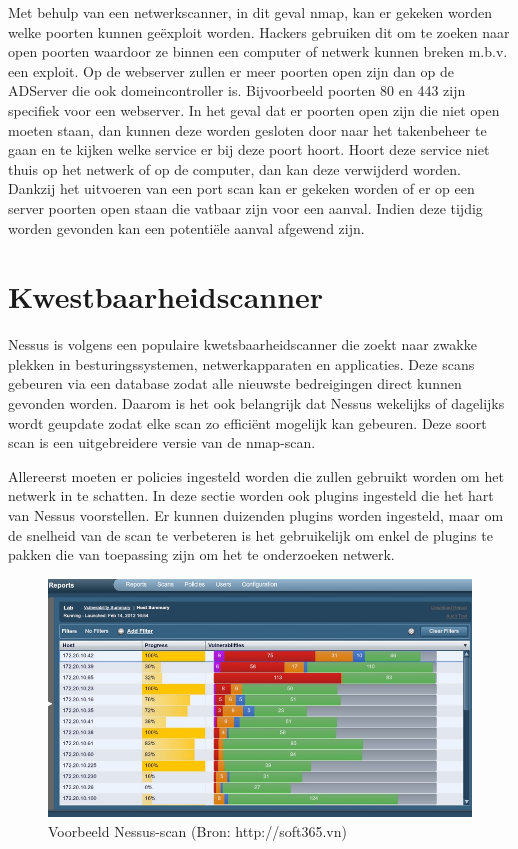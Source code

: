 \documentclass[pdftex,a4paper,12pt]{report}
\begin{document}
Met behulp van een netwerkscanner, in dit geval nmap, kan er gekeken worden welke poorten kunnen geëxploit worden. Hackers gebruiken dit om te zoeken naar open poorten waardoor ze binnen een computer of netwerk kunnen breken m.b.v. een exploit. Op de webserver zullen er meer poorten open zijn dan op de ADServer die ook domeincontroller is. Bijvoorbeeld poorten 80 en 443 zijn specifiek voor een webserver. In het geval dat er poorten open zijn die niet open moeten staan, dan kunnen deze worden gesloten door naar het takenbeheer te gaan en te kijken welke service er bij deze poort hoort. Hoort deze service niet thuis op het netwerk of op de computer, dan kan deze verwijderd worden. Dankzij het uitvoeren van een port scan kan er gekeken worden of er op een server poorten open staan die vatbaar zijn voor een aanval. Indien deze tijdig worden gevonden kan een potentiële aanval afgewend zijn.

\section{Kwestbaarheidscanner}
Nessus is volgens \cite{Jackson2010} een populaire kwetsbaarheidscanner die zoekt naar zwakke plekken in besturingssystemen, netwerkapparaten en applicaties. Deze scans gebeuren via een database zodat alle nieuwste bedreigingen direct kunnen gevonden worden. Daarom is het ook belangrijk dat Nessus wekelijks of dagelijks wordt geupdate zodat elke scan zo efficiënt mogelijk kan gebeuren. Deze soort scan is een uitgebreidere versie van de nmap-scan. \newline

Allereerst moeten er policies ingesteld worden die zullen gebruikt worden om het netwerk in te schatten. In deze sectie worden ook plugins ingesteld die het hart van Nessus voorstellen. Er kunnen duizenden plugins worden ingesteld, maar om de snelheid van de scan te verbeteren is het gebruikelijk om enkel de plugins te pakken die van toepassing zijn om het te onderzoeken netwerk. \newline

\begin{figure}[H]
\begin{center}
\includegraphics[scale=0.60]{img/Nessus1}
\end{center}
\caption{Voorbeeld Nessus-scan (Bron: http://soft365.vn)}
\end{figure}
\end{document}
